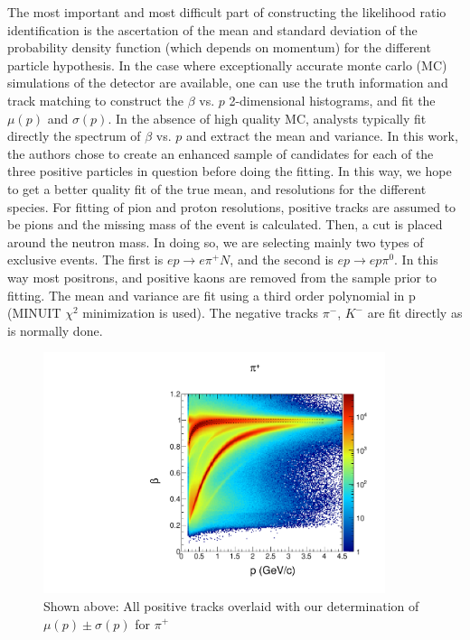 The most important and most difficult part of constructing the likelihood ratio identification is the ascertation of the mean and standard deviation of the probability density function (which depends on momentum) for the different particle hypothesis.  In the case where exceptionally accurate monte carlo (MC) simulations of the detector are available, one can use the truth information and track matching to construct the $\beta$ vs. $p$ 2-dimensional histograms, and fit the $\mu(p)$ and $\sigma(p)$.  In the absence of high quality MC, analysts typically fit directly the spectrum of $\beta$ vs. $p$ and extract the mean and variance.  In this work, the authors chose to create an enhanced sample of candidates for each of the three positive particles in question before doing the fitting.  In this way, we hope to get a better quality fit of the true mean, and resolutions for the different species.  For fitting of pion and proton resolutions, positive tracks are assumed to be pions and the missing mass of the event is calculated.  Then, a cut is placed around the neutron mass.  In doing so, we are selecting mainly two types of exclusive events.  The first is $ep \rightarrow e\pi^+N$, and the second is $ep \rightarrow ep\pi^0$.  In this way most positrons, and positive kaons are removed from the sample prior to fitting.  The mean and variance are fit using a third order polynomial in p (MINUIT $\chi^2$ minimization is used).  The negative tracks $\pi^-$, $K^-$ are fit directly as is normally done.

\begin{figure}
  \begin{center}
    \includegraphics[width=10cm]{image/plots/hadron-id/beautiful_pbeta_pip.pdf}
    \caption{ Shown above: All positive tracks overlaid with our determination of $\mu(p) \pm \sigma(p)$ for $\pi^+$}
  \end{center}
\end{figure}

